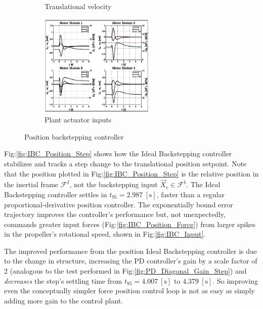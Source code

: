 \begin{figure}[htbp]
\begin{subfigure}{0.49\textwidth}
\vspace{-20pt}
\caption{Translational velocity}
\label{fig:IBC_Position_Velocity}
\end{subfigure}
\begin{subfigure}{\textwidth}
\centering
\includegraphics[width=0.6\textwidth]{graphs/IBC_Position_Input}
\vspace{-8pt}
\caption{Plant actuator inputs}
\label{fig:IBC_Position_Input}
\end{subfigure}
\vspace{-8pt}
\caption{Position backstepping controller}
\vspace{-20pt}
\end{figure}
\par
Fig:\ref{fig:IBC_Position_Step} shows how the Ideal Backstepping controller stabilizes and tracks a step change to the translational position setpoint. Note that the position plotted in Fig:\ref{fig:IBC_Position_Step} is the relative position in the inertial frame $\mathcal{F}^{I}$, not the backstepping input $\vec{X}_e\in\mathcal{F}^b$. The Ideal Backstepping controller settles in $t_{95}=2.987~[\text{s}]$, faster than a regular proportional-derivative position controller. The exponentially bound error trajectory improves the controller's performance but, not unexpectedly, commands greater input forces (Fig:\ref{fig:IBC_Position_Force}) from larger spikes in the propeller's rotational speed, shown in Fig:\ref{fig:IBC_Input}. 
\par
The improved performance from the position Ideal Backstepping controller is due to the change in structure, increasing the PD controller's gain by a scale factor of 2 (analogous to the test performed in Fig:\ref{fig:PD_Diagonal_Gain_Step}) and \emph{decreases} the step's settling time from $t_{95}=4.007~[\text{s}]$ to $4.379~[\text{s}]$. So improving even the conceptually simpler force position control loop is not as easy as simply adding more gain to the control plant. 
